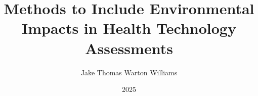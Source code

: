 \documentclass[a4paper]{book}
\title{Methods to Include Environmental Impacts in Health Technology Assessments}
\author{Jake Thomas Warton Williams}
\date{2025}
\begin{document}
\frontmatter %
    






\begin{singlespace}
    \setcounter{tocdepth}{1}
    \tableofcontents
\end{singlespace}

\mainmatter %












\appendix %










\clearpage
\end{document}
